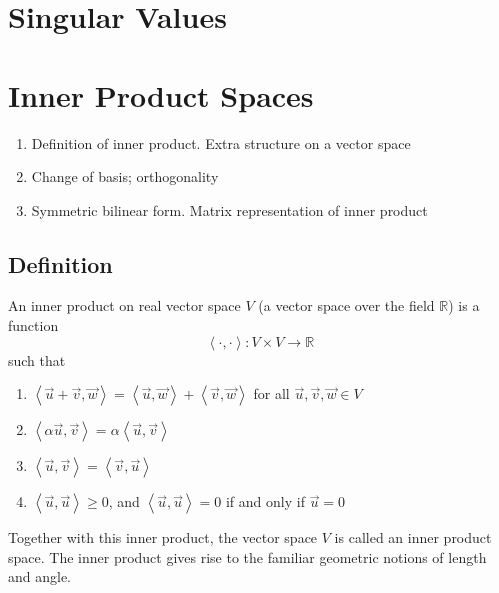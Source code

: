 \chapter{Singular Values}



































\chapter{Inner Product Spaces}

\begin{enumerate}
	\item Definition of inner product. Extra structure on a vector space
	\item Change of basis; orthogonality
	\item Symmetric bilinear form. Matrix representation of inner product
\end{enumerate}

\section{Definition}
An inner product on real vector space $V$ (a vector space over the field $\mathbb{R}$) is a function \[ \left\langle  \cdot, \cdot \right\rangle : V \times V \rightarrow \mathbb{R} \] such that
\begin{enumerate}
	\item $\left\langle \vec{u}+\vec{v} , \vec{w} \right\rangle = \left\langle \vec{u}, \vec{w} \right\rangle + \left\langle \vec{v}, \vec{w} \right\rangle $ for all $\vec{u}, \vec{v}, \vec{w} \in V$ \\
	\item $\left\langle \alpha \vec{u}, \vec{v} \right\rangle = \alpha \left\langle \vec{u}, \vec{v} \right\rangle $ \\
	\item $\left\langle \vec{u}, \vec{v} \right\rangle = \left\langle \vec{v}, \vec{u} \right\rangle $ \\
	\item $\left\langle \vec{u}, \vec{u} \right\rangle \geq 0$, and $\left\langle \vec{u}, \vec{u} \right\rangle =0 $ if and only if $\vec{u} = 0$
\end{enumerate}
Together with this inner product, the vector space $V$ is called an inner product space. The inner product gives rise to the familiar geometric notions of length and angle.


